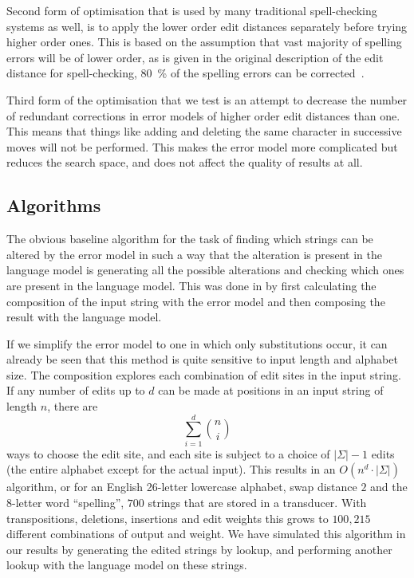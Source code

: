 \documentclass[11pt]{article}
\begin{document}
Second form of optimisation that is used by many traditional spell-checking
systems as well, is to apply the lower order edit distances separately before
trying higher order ones. This is based on the assumption that vast majority
of spelling errors will be of lower order, as is given in the original
description of the edit distance for spell-checking, 80~\% of the spelling
errors can be corrected~\cite{Pollock/1984}.

Third form of the optimisation that we test is an attempt to decrease the
number of redundant corrections in error models of higher order edit distances
than one. This means that things like  adding and deleting the
same character in successive moves will not be performed. This makes the error
model more complicated but reduces the search space, and does not affect the
quality of results at all.

\subsection{Algorithms}
\label{sec:algorithms}
The obvious baseline algorithm for the task of finding which strings can be
altered by the error model in such a way that the alteration is present in the
language model is generating all the possible alterations and checking which
ones are present in the language model. This was done in 
by first calculating the composition of the input string with the error
model and then composing the result with the language model.

If we simplify the error model to one in which only substitutions occur, it can
already be seen that this method is quite sensitive to input length and
alphabet size. The composition explores each combination of edit sites in the
input string. If any number of edits up to $d$ can be made at positions in an
input string of length $n$, there are
\begin{displaymath}
\sum_{i=1}^{d} {n \choose i}
\end{displaymath}
ways to choose the edit site, and each site is subject to a choice of
$|\Sigma| - 1$ edits (the
entire alphabet except for the actual input). This results in an $O(n^d \cdot
|\Sigma|)$ algorithm, or for an English 26-letter lowercase alphabet, swap
distance $2$ and the $8$-letter word ``spelling'', $700$ strings that are
stored in a transducer. With transpositions, deletions, insertions and edit
weights this grows to $100,215$ different combinations of output and weight. We
have simulated this algorithm in our results by generating the edited strings
by lookup, and performing another lookup with the language model on these
strings.
\end{document}
